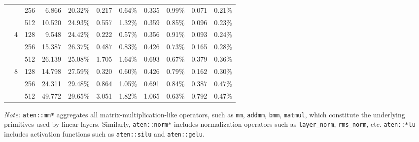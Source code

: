 \begin{table}[htbp]
{\begin{threeparttable}
\begin{tabular}{l c c
                r r
                r r
                r r
                r r}
& & 256 & 6.866  & 20.32\% & 0.217 & 0.64\% & 0.335 & 0.99\% & 0.071 & 0.21\% \\
& & 512 & 10.520 & 24.93\% & 0.557 & 1.32\% & 0.359 & 0.85\% & 0.096 & 0.23\% \\ \cmidrule(lr){3-11}
&  \multirow{3}{*}{4}  & 128 & 9.548  & 24.42\% & 0.222 & 0.57\% & 0.356 & 0.91\% & 0.093 & 0.24\% \\
&  & 256 & 15.387 & 26.37\% & 0.487 & 0.83\% & 0.426 & 0.73\% & 0.165 & 0.28\% \\
&  & 512 & 26.139 & 25.08\% & 1.705 & 1.64\% & 0.693 & 0.67\% & 0.379 & 0.36\% \\ \cmidrule(lr){3-11}
&  \multirow{3}{*}{8}  & 128 & 14.798 & 27.59\% & 0.320 & 0.60\% & 0.426 & 0.79\% & 0.162 & 0.30\% \\
&  & 256 & 24.311 & 29.48\% & 0.864 & 1.05\% & 0.691 & 0.84\% & 0.387 & 0.47\% \\
&  & 512 & 49.772 & 29.65\% & 3.051 & 1.82\% & 1.065 & 0.63\% & 0.792 & 0.47\% \\
\bottomrule
\end{tabular}
\begin{tablenotes}
\item \textit{Note:} \texttt{aten::mm*} aggregates all matrix-multiplication-like operators, such as \texttt{mm}, \texttt{addmm}, \texttt{bmm}, \texttt{matmul}, which constitute the underlying primitives used by linear layers. Similarly, \texttt{aten::norm*} includes normalization operators such as \texttt{layer\_norm}, \texttt{rms\_norm}, etc. \texttt{aten::*lu} includes activation functions such as \texttt{aten::silu} and \texttt{aten::gelu}. 
\end{tablenotes}
\label{tab:profile-prefill}
\end{threeparttable}}
\end{table}

